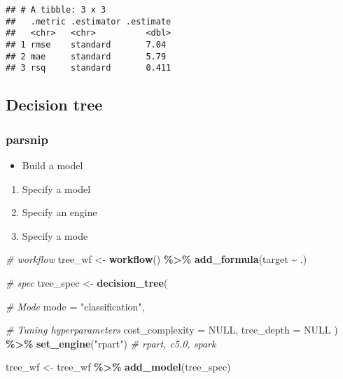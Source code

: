 \documentclass[
]{book}
\newenvironment{Shaded}{\begin{snugshade}}{\end{snugshade}}
\newcommand{\CommentTok}[1]{\textcolor[rgb]{0.56,0.35,0.01}{\textit{#1}}}
\newcommand{\DataTypeTok}[1]{\textcolor[rgb]{0.13,0.29,0.53}{#1}}
\newcommand{\KeywordTok}[1]{\textcolor[rgb]{0.13,0.29,0.53}{\textbf{#1}}}
\newcommand{\NormalTok}[1]{#1}
\newcommand{\OperatorTok}[1]{\textcolor[rgb]{0.81,0.36,0.00}{\textbf{#1}}}
\newcommand{\OtherTok}[1]{\textcolor[rgb]{0.56,0.35,0.01}{#1}}
\newcommand{\StringTok}[1]{\textcolor[rgb]{0.31,0.60,0.02}{#1}}
\providecommand{\tightlist}{%
  \setlength{\itemsep}{0pt}\setlength{\parskip}{0pt}}
\begin{document}
\begin{verbatim}
## # A tibble: 3 x 3
##   .metric .estimator .estimate
##   <chr>   <chr>          <dbl>
## 1 rmse    standard       7.04 
## 2 mae     standard       5.79 
## 3 rsq     standard       0.411
\end{verbatim}

\hypertarget{decision-tree}{%
\subsection{Decision tree}\label{decision-tree}}

\hypertarget{parsnip-1}{%
\subsubsection{parsnip}\label{parsnip-1}}

\begin{itemize}
\tightlist
\item
  Build a model
\end{itemize}

\begin{enumerate}
\def\labelenumi{\arabic{enumi}.}
\tightlist
\item
  Specify a model
\item
  Specify an engine
\item
  Specify a mode
\end{enumerate}

\begin{Shaded}
\begin{Highlighting}[]
\CommentTok{\# workflow}
\NormalTok{tree\_wf \textless{}{-}}\StringTok{ }\KeywordTok{workflow}\NormalTok{() }\OperatorTok{\%\textgreater{}\%}\StringTok{ }\KeywordTok{add\_formula}\NormalTok{(target }\OperatorTok{\textasciitilde{}}\StringTok{ }\NormalTok{.)}

\CommentTok{\# spec}
\NormalTok{tree\_spec \textless{}{-}}\StringTok{ }\KeywordTok{decision\_tree}\NormalTok{(}

  \CommentTok{\# Mode}
  \DataTypeTok{mode =} \StringTok{"classification"}\NormalTok{,}

  \CommentTok{\# Tuning hyperparameters}
  \DataTypeTok{cost\_complexity =} \OtherTok{NULL}\NormalTok{,}
  \DataTypeTok{tree\_depth =} \OtherTok{NULL}
\NormalTok{) }\OperatorTok{\%\textgreater{}\%}
\StringTok{  }\KeywordTok{set\_engine}\NormalTok{(}\StringTok{"rpart"}\NormalTok{) }\CommentTok{\# rpart, c5.0, spark}

\NormalTok{tree\_wf \textless{}{-}}\StringTok{ }\NormalTok{tree\_wf }\OperatorTok{\%\textgreater{}\%}\StringTok{ }\KeywordTok{add\_model}\NormalTok{(tree\_spec)}
\end{Highlighting}
\end{Shaded}
\end{document}
